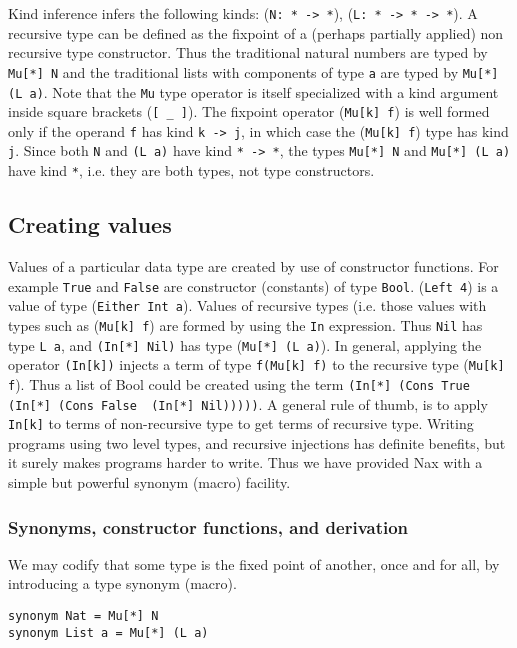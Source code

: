 Kind inference infers the following kinds:
(\verb+N: * -> *+),  (\verb+L: * -> * -> *+). 
A recursive type can be defined as the fixpoint of a (perhaps partially applied)
non recursive type constructor. Thus the traditional natural numbers are typed by \verb+Mu[*] N+
and the traditional lists with components of type \verb+a+ are typed by
\verb+Mu[*] (L a)+.  Note that the \verb+Mu+ type operator is itself specialized with a kind argument inside
square brackets (\verb+[ _ ]+). The fixpoint operator (\verb+Mu[k] f+) is well formed only
if the operand \verb+f+ has kind \verb+k -> j+, in which case the (\verb+Mu[k] f+) type
has kind \verb+j+. Since both \verb+N+ and \verb+(L a)+ have kind \verb+* -> *+,
the types  \verb+Mu[*] N+ and \verb+Mu[*] (L a)+ have kind \verb+*+, i.e. they 
are both types, not type constructors.

\subsection{Creating values}

Values of a particular data type are created by use of constructor functions. For
example \verb+True+ and \verb+False+ are constructor (constants) of type \verb+Bool+.
(\verb+Left 4+) is a value of type (\verb+Either Int a+). Values of recursive types
(i.e. those values with types such as (\verb+Mu[k] f+) are formed by using the \verb+In+
expression. Thus \verb+Nil+ has type \verb+L a+, and \verb+(In[*] Nil)+ has type
(\verb+Mu[*] (L a)+). In general, applying the operator \verb+(In[k])+ injects a term of
type \verb+f(Mu[k] f)+ to the recursive type (\verb+Mu[k] f+). Thus a list of Bool could be
created using the term \verb+(In[*] (Cons True  (In[*] (Cons False  (In[*] Nil)))))+. 
A general rule of thumb, is to apply \verb+In[k]+ to terms of non-recursive type
to get terms of recursive type. Writing programs using two level types, and recursive
injections has definite benefits, but it surely makes programs harder to write. Thus
we have provided Nax with a simple but powerful synonym (macro) facility.

\subsubsection{Synonyms, constructor functions, and derivation}\label{macro}

We may codify that some type is the fixed point of another, once and for all, by introducing
a type synonym (macro).

{\small
\begin{verbatim}
synonym Nat = Mu[*] N
synonym List a = Mu[*] (L a)     
\end{verbatim}}


